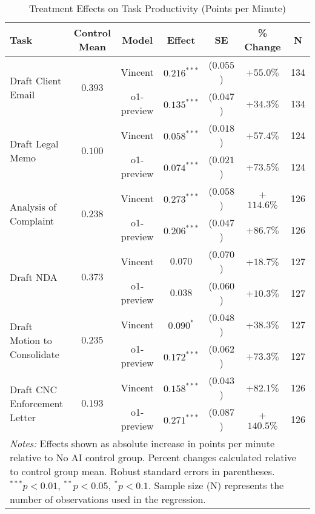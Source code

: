 \begin{table}[!htbp]
\centering
\caption{Treatment Effects on Task Productivity (Points per Minute)}
\label{tab:productivity_effects}
\begin{tabular}{lcccccc}
\hline\hline
Task & Control Mean & Model & Effect & SE & \% Change & N \\
\hline
\multirow{2}{*}{Draft Client Email} & \multirow{2}{*}{$0.393$} & Vincent & $0.216^{***}$ & ($0.055$) & +$55.0\%$ & 134 \\
& & o1-preview & $0.135^{***}$ & ($0.047$) & +$34.3\%$ & 134 \\
\hline
\multirow{2}{*}{Draft Legal Memo} & \multirow{2}{*}{$0.100$} & Vincent & $0.058^{***}$ & ($0.018$) & +$57.4\%$ & 124 \\
& & o1-preview & $0.074^{***}$ & ($0.021$) & +$73.5\%$ & 124 \\
\hline
\multirow{2}{*}{Analysis of Complaint} & \multirow{2}{*}{$0.238$} & Vincent & $0.273^{***}$ & ($0.058$) & +$114.6\%$ & 126 \\
& & o1-preview & $0.206^{***}$ & ($0.047$) & +$86.7\%$ & 126 \\
\hline
\multirow{2}{*}{Draft NDA} & \multirow{2}{*}{$0.373$} & Vincent & $0.070$ & ($0.070$) & +$18.7\%$ & 127 \\
& & o1-preview & $0.038$ & ($0.060$) & +$10.3\%$ & 127 \\
\hline
\multirow{2}{*}{Draft Motion to Consolidate} & \multirow{2}{*}{$0.235$} & Vincent & $0.090^{*}$ & ($0.048$) & +$38.3\%$ & 127 \\
& & o1-preview & $0.172^{***}$ & ($0.062$) & +$73.3\%$ & 127 \\
\hline
\multirow{2}{*}{Draft CNC Enforcement Letter} & \multirow{2}{*}{$0.193$} & Vincent & $0.158^{***}$ & ($0.043$) & +$82.1\%$ & 126 \\
& & o1-preview & $0.271^{***}$ & ($0.087$) & +$140.5\%$ & 126 \\
\hline
\multicolumn{7}{p{0.95\linewidth}}{\footnotesize \textit{Notes:} Effects shown as absolute increase in points per minute relative to No AI control group. Percent changes calculated relative to control group mean. Robust standard errors in parentheses. $^{***}p<0.01$, $^{**}p<0.05$, $^{*}p<0.1$. Sample size (N) represents the number of observations used in the regression.}
\end{tabular}
\end{table}